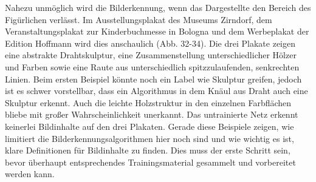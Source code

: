 \documentclass[a4paper,12pt,ngerman]{article}
\begin{document}
Nahezu unmöglich wird die Bilderkennung, wenn das Dargestellte den Bereich des Figürlichen verlässt. Im Ausstellungsplakat des Museums Zirndorf, dem Veranstaltungsplakat zur Kinderbuchmesse in Bologna und dem Werbeplakat der Edition Hoffmann wird dies anschaulich (Abb. 32-34). Die drei Plakate zeigen eine abstrakte Drahtskulptur, eine Zusammenstellung unterschiedlicher Hölzer und Farben sowie eine Raute aus unterschiedlich spitzzulaufenden, senkrechten Linien. Beim ersten Beispiel könnte noch ein Label wie Skulptur greifen, jedoch ist es schwer vorstellbar, dass ein Algorithmus in dem Knäul aus Draht auch eine Skulptur erkennt. Auch die leichte Holzstruktur in den einzelnen Farbflächen bliebe mit großer Wahrscheinlichkeit unerkannt. Das untrainierte Netz erkennt keinerlei Bildinhalte auf den drei Plakaten. Gerade diese Beispiele zeigen, wie limitiert die Bilderkennungsalgorithmen hier noch sind und wie wichtig es ist, klare Definitionen für Bildinhalte zu finden. Dies muss der erste Schritt sein, bevor überhaupt entsprechendes Trainingsmaterial gesammelt und vorbereitet werden kann. \\
\end{document}
